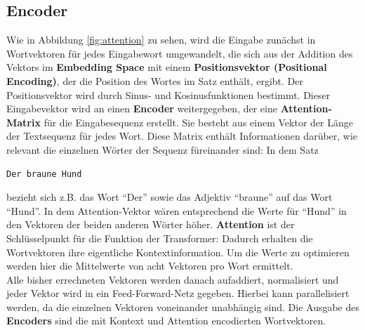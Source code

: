 \subsection*{Encoder}
Wie in Abbildung \ref{fig:attention} zu sehen, wird die Eingabe zun\"achst in Wortvektoren f\"ur jedes Eingabewort umgewandelt, die sich aus der Addition des Vektors im \textbf{Embedding Space} mit einem \textbf{Positionsvektor (Positional Encoding)}, der die Position des Wortes im Satz enth\"alt, ergibt. Der Positionsvektor wird durch Sinus- und Kosinusfunktionen bestimmt. Dieser Eingabevektor wird an einen \textbf{Encoder} weitergegeben, der eine \textbf{Attention-Matrix} f\"ur die Eingabesequenz erstellt. Sie besteht aus einem Vektor der L\"ange der Textsequenz f\"ur jedes Wort. Diese Matrix enth\"alt Informationen dar\"uber, wie relevant die einzelnen W\"orter der Sequenz f\"ureinander sind: In dem Satz
\begin{verbatim} 
Der braune Hund
\end{verbatim} 
bezieht sich z.B. das Wort "`Der"' sowie das Adjektiv "`braune"' auf das Wort "`Hund"'. In dem Attention-Vektor w\"aren entsprechend die Werte f\"ur "`Hund"' in den Vektoren der beiden anderen W\"orter h\"oher. \textbf{Attention} ist der Schl\"usselpunkt f\"ur die Funktion der Transformer: Dadurch erhalten die Wortvektoren ihre eigentliche Kontextinformation. Um die Werte zu optimieren werden hier die Mittelwerte von acht Vektoren pro Wort ermittelt.\\
Alle bisher errechneten Vektoren werden danach aufaddiert, normalisiert und jeder Vektor wird in ein Feed-Forward-Netz gegeben. Hierbei kann parallelisiert werden, da die einzelnen Vektoren voneinander unabh\"angig sind. Die Ausgabe des \textbf{Encoders} sind die mit Kontext und Attention encodierten Wortvektoren.\\


